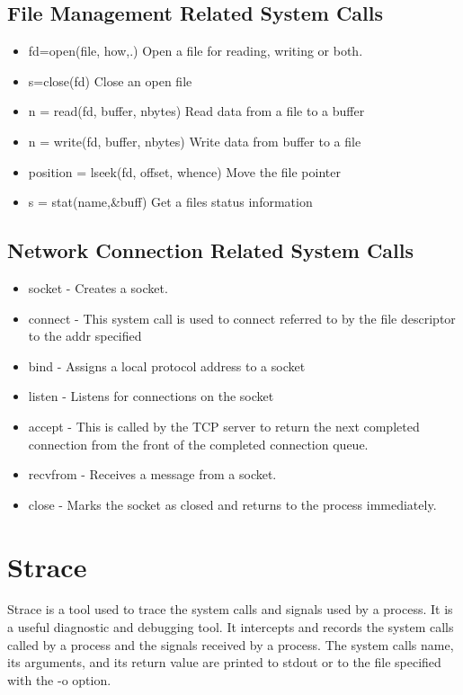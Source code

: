 \documentclass[12pt]{report}
\begin{document}
\subsection{File Management Related System Calls}
\begin{itemize}
	\item fd=open(file, how,.)                Open a file for reading, writing or both.
	\item s=close(fd)                        Close an open file
	\item n = read(fd, buffer, nbytes)         Read data from a file to a buffer
	\item n = write(fd, buffer, nbytes)        Write data from buffer to a file
	\item position = lseek(fd, offset, whence) Move the file pointer 
	\item s = stat(name,\&buff)              Get a file\textquotesingle s status information
\end{itemize}
\subsection{Network Connection Related System Calls}
\begin{itemize}
	
	\item socket          - Creates a socket.
	\item connect         - This system call is used to connect referred to by the file descriptor to the addr specified
	
	\item bind            - Assigns a local protocol address to a socket
	\item listen          - Listens for connections on the socket 
	\item accept          - This is called by the TCP server to return the next completed
	connection from the front of the completed connection queue.
	\item recvfrom         - Receives a message from a socket.  	                        
	\item close           - Marks the socket as closed and returns to the process
	immediately.                         
\end{itemize}
\section{Strace}

Strace is a tool used to trace the system calls and signals used by a process. It is a useful diagnostic and debugging tool. It intercepts and records the system calls called by a process and the signals received by a process. The system call\textquotesingle s name, its arguments, and its 
return value are printed to stdout or to the file specified with 
the -o option. 
\end{document}
